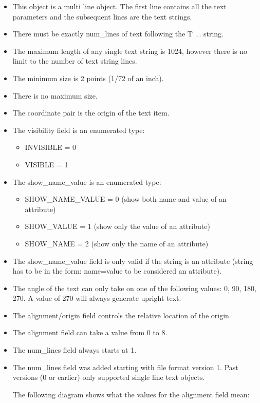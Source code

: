 \documentclass{article}
\begin{document}
\begin{itemize}
\item This object is a multi line object.  The first line contains all the 
      text parameters and the subsequent lines are the text strings.  
\item There must be exactly num\_lines of text following the T ... string.
\item The maximum length of any single text string is 1024, however there 
      is no limit to the number of text string lines.
\item The minimum size is 2 points (1/72 of an inch).
\item There is no maximum size.
\item The coordinate pair is the origin of the text item.
\item The visibility field is an enumerated type:
\begin{itemize}
	\item INVISIBLE = 0 
	\item VISIBLE = 1
\end{itemize}
\item The show\_name\_value is an enumerated type:
\begin{itemize}
	\item SHOW\_NAME\_VALUE = 0  (show both name and value of an attribute)
	\item SHOW\_VALUE = 1 (show only the value of an attribute)
	\item SHOW\_NAME = 2  (show only the name of an attribute)
\end{itemize}
\item The show\_name\_value field is only valid if the string is an attribute
      (string has to be in the form: name=value to be considered an attribute).
\item The angle of the text can only take on one of the following values: 
      0, 90, 180, 270.  A value of 270 will always generate upright text.
\item The alignment/origin field controls the relative location of the 
      origin.
\item The alignment field can take a value from 0 to 8.
\item The num\_lines field always starts at 1. 
\item The num\_lines field was added starting with file format version 1.  
      Past versions (0 or earlier) only supported single line text objects.

The following diagram shows what the values for the alignment field mean:

\begin{center}
\end{center}
\end{itemize}
\end{document}
